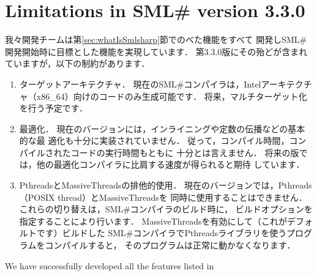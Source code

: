 \documentclass{jbook}
\newcommand{\txt}[2]{#2}
\newcommand{\smlsharp}{SML\#}
\newcommand{\version}{3.3.0}
\begin{document}
\section{
\txt{\smlsharp{}第\version{}版の機能と制限}
{Limitations in \smlsharp{} version \version{}}
}
\label{sec:smlsharpLimitation}

\ifjp%
	我々開発チームは第\ref{sec:whatIsSmlsharp}節でのべた機能をすべて
開発し\smlsharp{}開発開始時に目標とした機能を実現しています．
	第\version{}版にその殆どが含まれていますが，以下の制約があります．
\begin{enumerate}
\item ターゲットアーキテクチャ．
	現在の\smlsharp{}コンパイラは，Intelアーキテクチャ（x86\_64）向けのコードのみ生成可能です．
	将来，マルチターゲット化を行う予定です．

\item 最適化．
	現在のバージョンには，インライニングや定数の伝播などの基本的な最
適化も十分に実装されていません．
	従って，コンパイル時間，コンパイルされたコードの実行時間もともに
十分とは言えません．
	将来の版では，他の最適化コンパイラに比肩する速度が得られると期待
しています．

\item PthreadsとMassiveThreadsの排他的使用．
	現在のバージョンでは，Pthreads（POSIX thread）とMassiveThreadsを
同時に使用することはできません．
	これらの切り替えは，\smlsharp{}コンパイラのビルド時に，
ビルドオプションを指定することにより行います．
	MassiveThreadsを有効にして（これがデフォルトです）ビルドした
\smlsharp{}コンパイラでPthreadsライブラリを使うプログラムをコンパイルすると，
そのプログラムは正常に動かなくなります．

\end{enumerate}
\else%
	We have successfully developed all the features listed in
\end{document}

